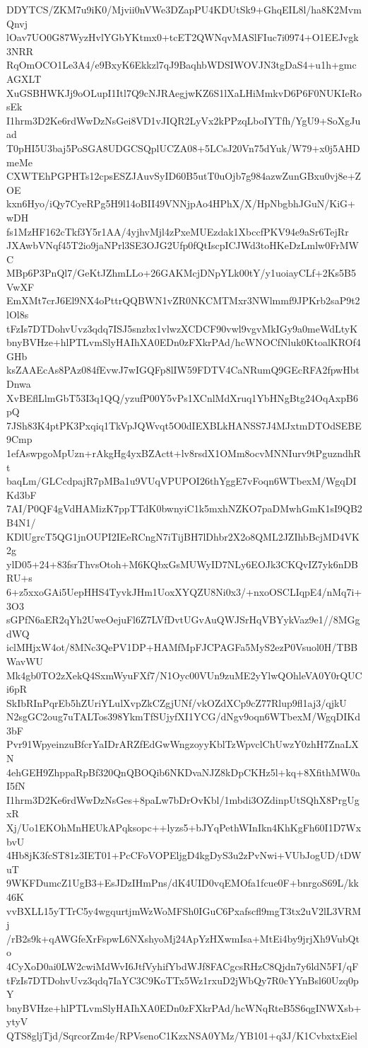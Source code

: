 DDYTCS/ZKM7u9iK0/Mjvii0nVWe3DZapPU4KDUtSk9+GhqEIL8l/ha8K2MvmQnvj
lOav7UO0G87WyzHvlYGbYKtmx0+tcET2QWNqvMASlFIuc7i0974+O1EEJvgk3NRR
RqOmOCO1Le3A4/e9BxyK6Ekkzl7qJ9BaqhbWDSIWOVJN3tgDaS4+u1h+gmcAGXLT
XuGSBHWKJj9oOLupI1Itl7Q9cNJRAegjwKZ6S1lXaLHiMmkvD6P6F0NUKIeRosEk
I1hrm3D2Ke6rdWwDzNsGei8VD1vJIQR2LyVx2kPPzqLboIYTfh/YgU9+SoXgJuad
T0pHI5U3baj5PoSGA8UDGCSQplUCZA08+5LCsJ20Vn75dYuk/W79+x0j5AHDmeMe
CXWTEhPGPHTs12cpsESZJAuvSyID60B5utT0uOjb7g984azwZunGBxu0vj8e+ZOE
kxn6Hyo/iQy7CyeRPg5H9l14oBII49VNNjpAo4HPhX/X/HpNbgbhJGuN/KiG+wDH
fs1MzHF162cTkf3Y5r1AA/4yjhvMjl4zPxeMUEzdak1XbccfPKV94e9aSr6TejRr
JXAwbVNqf45T2io9jaNPrl3SE3OJG2Ufp0fQtIscpICJWd3toHKeDzLmlw0FrMWC
MBp6P3PnQl7/GeKtJZhmLLo+26GAKMcjDNpYLk00tY/y1uoiayCLf+2Ks5B5VwXF
EmXMt7crJ6El9NX4oPttrQQBWN1vZR0NKCMTMxr3NWlmmf9JPKrb2saP9t2lOl8s
tFzIs7DTDohvUvz3qdq7ISJ5snzbx1vlwzXCDCF90vwl9vgvMkIGy9a0meWdLtyK
bnyBVHze+hlPTLvmSlyHAIhXA0EDn0zFXkrPAd/hcWNOCfNluk0KtoalKROf4GHb
ksZAAEcAs8PAz084fEvwJ7wIGQFp8lIW59FDTV4CaNRumQ9GEcRFA2fpwHbtDnwa
XvBEflLlmGbT53I3q1QQ/yzufP00Y5vPs1XCnlMdXruq1YbHNgBtg24OqAxpB6pQ
7JSh83K4ptPK3Pxqiq1TkVpJQWvqt5O0dIEXBLkHANSS7J4MJxtmDTOdSEBE9Cmp
1efAswpgoMpUzn+rAkgHg4yxBZActt+lv8rsdX1OMm8ocvMNNIurv9tPguzndhRt
baqLm/GLCcdpajR7pMBa1u9VUqVPUPOI26thYggE7vFoqn6WTbexM/WgqDIKd3bF
7AI/P0QF4gVdHAMizK7ppTTdK0bwnyiC1k5mxhNZKO7paDMwhGmK1sI9QB2B4N1/
KDlUgrcT5QG1jnOUPI2IEeRCngN7iTijBH7lDhbr2X2o8QML2JZIhbBcjMD4VK2g
ylD05+24+83fsrThvsOtoh+M6KQbxGsMUWyID7NLy6EOJk3CKQvIZ7yk6nDBRU+s
6+z5xxoGAi5UepHHS4TyvkJHm1UoxXYQZU8Ni0x3/+nxoOSCLIqpE4/nMq7i+3O3
sGPfN6aER2qYh2UweOejuFl6Z7LVfDvtUGvAuQWJSrHqVBYykVaz9e1//8MGgdWQ
iclMHjxW4ot/8MNc3QePV1DP+HAMfMpFJCPAGFa5MyS2ezP0Vsuol0H/TBBWavWU
Mk4gb0TO2zXekQ4SxmWyuFXf7/N1Oyc00VUn9zuME2yYlwQOhleVA0Y0rQUCi6pR
SkIbRInPqrEb5hZUriYLulXvpZkCZgjUNf/vkOZdXCp9cZ77Rlup9fl1aj3/qjkU
N2sgGC2oug7uTALTos398YkmTfSUjyfXI1YCG/dNgv9oqn6WTbexM/WgqDIKd3bF
Pvr91WpyeinzuBfcrYaIDrARZfEdGwWngzoyyKblTzWpvclChUwzY0zhH7ZnaLXN
4ehGEH9ZhppaRpBf320QnQBOQib6NKDvaNJZ8kDpCKHz5l+kq+8XfithMW0aI5fN
I1hrm3D2Ke6rdWwDzNsGes+8paLw7bDrOvKbl/1mbdi3OZdinpUtSQhX8PrgUgxR
Xj/Uo1EKOhMnHEUkAPqksopc++lyzs5+bJYqPethWInIkn4KhKgFh60I1D7WxbvU
4Hb8jK3fcST81z3IET01+PcCFoVOPEljgD4kgDyS3u2zPvNwi+VUbJogUD/tDWuT
9WKFDumcZ1UgB3+EsJDzIHmPns/dK4UID0vqEMOfa1fcue0F+bnrgoS69L/kk46K
vvBXLL15yTTrC5y4wgqurtjmWzWoMFSh0IGuC6Pxafscfl9mgT3tx2uV2lL3VRMj
/rB2s9k+qAWGfeXrFspwL6NXshyoMj24ApYzHXwmIsa+MtEi4by9jrjXh9VubQto
4CyXoD0ai0LW2cwiMdWvI6JtfVyhifYbdWJf8FACgcsRHzC8Qjdn7y6ldN5FI/qF
tFzIs7DTDohvUvz3qdq7IaYC3C9KoTTx5Wz1rxuD2jWbQy7R0cYYnBsl60Uzq0pY
bnyBVHze+hlPTLvmSlyHAIhXA0EDn0zFXkrPAd/hcWNqRteB5S6qgINWXsb+ytyV
QTS8gljTjd/SqrcorZm4e/RPVsenoC1KzxNSA0YMz/YB101+q3J/K1CvbxtxEiel
